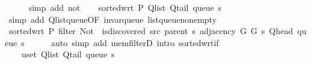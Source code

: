 \begin{isabellebody}
\ \ \ \ \isamarkupfalse%
\ {\isacharparenleft}{\kern0pt}simp\ add{\isacharcolon}{\kern0pt}\ not{\isacharunderscore}{\kern0pt}{\isacharparenleft}{\kern0pt}{}{\isacharparenright}{\kern0pt}{\isacharparenright}{\kern0pt}\isanewline
\ \ \isamarkupfalse%
\ {\isachardoublequoteopen}sorted{\isacharunderscore}{\kern0pt}wrt\ {\isacharquery}{\kern0pt}P\ {\isacharparenleft}{\kern0pt}Q{\isacharunderscore}{\kern0pt}list\ {\isacharparenleft}{\kern0pt}Q{\isacharunderscore}{\kern0pt}tail\ {\isacharparenleft}{\kern0pt}queue\ s{\isacharparenright}{\kern0pt}{\isacharparenright}{\kern0pt}{\isacharparenright}{\kern0pt}{\isachardoublequoteclose}\isanewline
\ \ \ \ \isamarkupfalse%
\ {\isacharparenleft}{\kern0pt}simp\ add{\isacharcolon}{\kern0pt}\ Q{\isachardot}{\kern0pt}list{\isacharunderscore}{\kern0pt}queue{\isacharbrackleft}{\kern0pt}OF\ invar{\isacharunderscore}{\kern0pt}queue\ list{\isacharunderscore}{\kern0pt}queue{\isacharunderscore}{\kern0pt}non{\isacharunderscore}{\kern0pt}empty{\isacharbrackright}{\kern0pt}{\isacharparenright}{\kern0pt}\isanewline
\ \ \isamarkupfalse%
\ \isamarkupfalse%
\ {\isachardoublequoteopen}sorted{\isacharunderscore}{\kern0pt}wrt\ {\isacharquery}{\kern0pt}P\ {\isacharparenleft}{\kern0pt}filter\ {\isacharparenleft}{\kern0pt}Not\ {\isasymcirc}\ is{\isacharunderscore}{\kern0pt}discovered\ src\ {\isacharparenleft}{\kern0pt}parent\ s{\isacharparenright}{\kern0pt}{\isacharparenright}{\kern0pt}\ {\isacharparenleft}{\kern0pt}adjacency\ G{}\ G{}\ s\ {\isacharparenleft}{\kern0pt}Q{\isacharunderscore}{\kern0pt}head\ {\isacharparenleft}{\kern0pt}queue\ s{\isacharparenright}{\kern0pt}{\isacharparenright}{\kern0pt}{\isacharparenright}{\kern0pt}{\isacharparenright}{\kern0pt}{\isachardoublequoteclose}\isanewline
\ \ \ \ \isamarkupfalse%
\ {\isacharparenleft}{\kern0pt}auto\ simp\ add{\isacharcolon}{\kern0pt}\ mem{\isacharunderscore}{\kern0pt}filterD{\isacharparenleft}{\kern0pt}{}{\isacharparenright}{\kern0pt}\ intro{\isacharcolon}{\kern0pt}\ sorted{\isacharunderscore}{\kern0pt}wrt{\isacharunderscore}{\kern0pt}if{\isacharparenright}{\kern0pt}\isanewline
\ \ \isamarkupfalse%
\ \isamarkupfalse%
\isanewline
\ \ \ \ {\isachardoublequoteopen}{\isasymforall}u{\isasymin}set\ {\isacharparenleft}{\kern0pt}Q{\isacharunderscore}{\kern0pt}list\ {\isacharparenleft}{\kern0pt}Q{\isacharunderscore}{\kern0pt}tail\ {\isacharparenleft}{\kern0pt}queue\ s{\isacharparenright}{\kern0pt}{\isacharparenright}{\kern0pt}{\isacharparenright}{\kern0pt}{\isachardot}{\kern0pt}\isanewline

\end{isabellebody}
